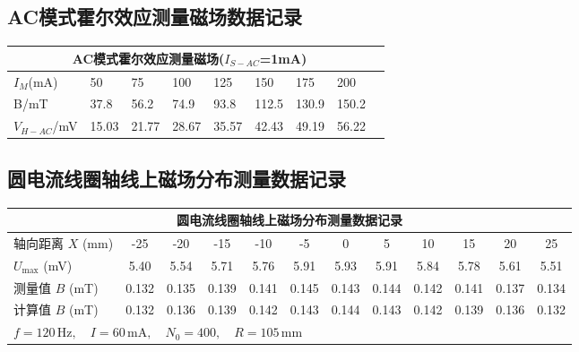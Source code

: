 \documentclass[UTF-8,twoside,cs4size]{ctexart}
\begin{document}
    \subsection{AC模式霍尔效应测量磁场数据记录}
        \begin{table}[!h]
            \centering
            \begin{tabular}{|l|l|l|l|l|l|l|l|l|}
            \hline
                \multicolumn{8}{|c|}{AC模式霍尔效应测量磁场($I_{S-AC}$=1mA)} \\ \hline
                $I_M$(mA) & 50 & 75 & 100 & 125 & 150 & 175 & 200 \\ \hline
                B/mT & 37.8 & 56.2 & 74.9 & 93.8 & 112.5 & 130.9 & 150.2 \\ \hline
                $V_{H-AC}$/mV & 15.03 & 21.77 & 28.67 & 35.57 & 42.43 & 49.19 & 56.22 \\ \hline
            \end{tabular}
        \end{table}
    
        \subsection{圆电流线圈轴线上磁场分布测量数据记录}
        \begin{table}[!h]
            \centering
            \begin{tabular}{|l|c|c|c|c|c|c|c|c|c|c|c|}
            \hline
                \multicolumn{12}{|c|}{圆电流线圈轴线上磁场分布测量数据记录}  \\ \hline
                轴向距离 $X$ (mm) & -25 & -20 & -15 & -10 & -5 & 0 & 5 & 10 & 15 & 20 & 25 \\ \hline
                $U_{\text{max}}$ (mV) & 5.40 & 5.54 & 5.71 & 5.76 & 5.91 & 5.93 & 5.91 & 5.84 & 5.78 & 5.61 & 5.51 \\ \hline
                测量值 $B$ (mT) & 0.132 & 0.135 & 0.139 & 0.141 & 0.145 & 0.143 & 0.144 & 0.142 & 0.141 & 0.137 & 0.134 \\ \hline
                计算值 $B$ (mT) & 0.132 & 0.136 & 0.139 & 0.142 & 0.143 & 0.144 & 0.143 & 0.142 & 0.139 & 0.136 & 0.132 \\ \hline
                \multicolumn{12}{|l|}{\( f = 120\,\text{Hz},\quad I = 60\,\text{mA},\quad N_0 = 400,\quad R = 105\,\text{mm} \)} \\ \hline
            \end{tabular}
        \end{table}
\end{document}
